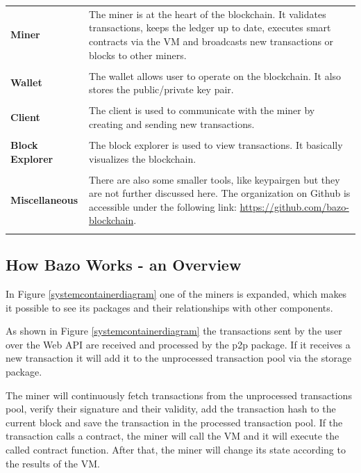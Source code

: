 \begin{tabular}[t]{ p{3cm} p{12.5cm}}
\textbf{Miner} &
The miner is at the heart of the blockchain. It validates transactions, keeps the ledger up to date, executes smart contracts via the VM and broadcasts new transactions or blocks to other miners. \\ \\
 
\raggedright
\textbf{Wallet} &
The wallet allows user to operate on the blockchain. It also stores the public/private key pair. \cite{ba_wallet} \\ \\
 
\textbf{Client} &
The client is used to communicate with the miner by creating and sending new transactions. \\ \\

\raggedright
\textbf{Block Explorer} & 
The block explorer is used to view transactions. It basically visualizes the blockchain. \\ \\

\raggedright
\textbf{Miscellaneous} & 
There are also some smaller tools, like keypairgen but they are not further discussed here. The organization on Github is accessible under the following link: \href{https://github.com/bazo-blockchain}{https://github.com/bazo-blockchain}. \\ \\
\end{tabular}

\subsection{How Bazo Works - an Overview}
In Figure \ref{systemcontainerdiagram} one of the miners is expanded, which makes it possible to see its packages and their relationships with other components. 

As shown in Figure \ref{systemcontainerdiagram} the transactions sent by the user over the Web API are received and processed by the \Gls{p2p} package. If it receives a new transaction it will add it to the unprocessed transaction pool via the storage package. 

The miner will continuously fetch transactions from the unprocessed transactions pool, verify their signature and their validity, add the transaction hash to the current block and save the transaction in the processed transaction pool. If the transaction calls a contract, the miner will call the VM and it will execute the called contract function. After that, the miner will change its state according to the results of the VM.

